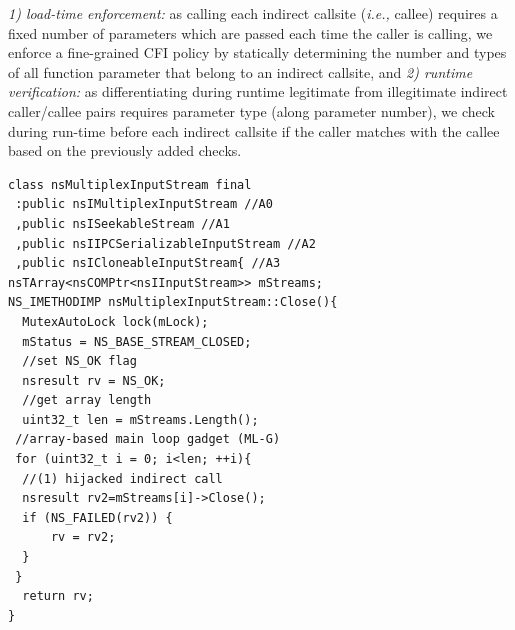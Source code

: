 \textit{1) load-time enforcement:} as calling each indirect callsite (\textit{i.e.,} callee) requires a fixed number of parameters which are passed each time the caller is calling, we enforce a fine-grained CFI policy by statically determining the number and types of all function parameter that belong to an indirect callsite, and
\textit{2) runtime verification:} as differentiating during runtime legitimate from illegitimate indirect caller/callee pairs requires parameter type (along parameter number), we check during run-time before each indirect callsite if the caller matches with the callee based on the previously added checks.


\newsavebox{\firstlisting}
\begin{lrbox}{\firstlisting}
\begin{minipage}[c]{\linewidth}
\begin{verbatim}
class nsMultiplexInputStream final 
 :public nsIMultiplexInputStream //A0
 ,public nsISeekableStream //A1
 ,public nsIIPCSerializableInputStream //A2
 ,public nsICloneableInputStream{ //A3
nsTArray<nsCOMPtr<nsIInputStream>> mStreams;
NS_IMETHODIMP nsMultiplexInputStream::Close(){
  MutexAutoLock lock(mLock);
  mStatus = NS_BASE_STREAM_CLOSED;
  //set NS_OK flag
  nsresult rv = NS_OK;
  //get array length
  uint32_t len = mStreams.Length();
 //array-based main loop gadget (ML-G)
 for (uint32_t i = 0; i<len; ++i){
  //(1) hijacked indirect call
  nsresult rv2=mStreams[i]->Close();
  if (NS_FAILED(rv2)) {
      rv = rv2;
  }
 }
  return rv;
}
\end{verbatim}
\end{minipage}
\end{lrbox}

